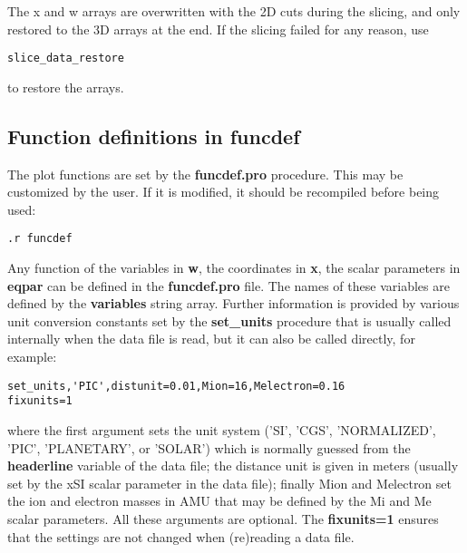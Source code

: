 \documentclass{article}
\begin{document}
   The x and w arrays are overwritten with the 2D cuts during the slicing,
   and only restored to the 3D arrays at the end.
   If the slicing failed for any reason, use
\begin{verbatim}
slice_data_restore
\end{verbatim}
   to restore the arrays.

\subsection{Function definitions in funcdef \label{s-funcdef}}

   The plot functions are set by the {\bf funcdef.pro} procedure.
   This may be customized by the user. If it is modified, 
   it should be recompiled before being used:
\begin{verbatim}
.r funcdef
\end{verbatim}
   Any function of the variables in {\bf w}, the coordinates in
   {\bf x}, the scalar parameters in {\bf eqpar} can be defined in the 
   {\bf funcdef.pro} file. The names of these variables are defined
   by the {\bf variables} string array.
   Further information is provided by various
   unit conversion constants set by the {\bf set\_units} procedure that
   is usually called internally when the data file is read, 
   but it can also be called directly, for example:
\begin{verbatim}
set_units,'PIC',distunit=0.01,Mion=16,Melectron=0.16
fixunits=1
\end{verbatim}
   where the first argument sets the unit system
   ('SI', 'CGS', 'NORMALIZED', 'PIC', 'PLANETARY', or 'SOLAR')
   which is normally guessed from the {\bf headerline} variable
   of the data file;
   the distance unit is given in meters (usually set by the xSI
   scalar parameter in the data file); finally 
   Mion and Melectron set the ion and electron masses in AMU
   that may be defined by the Mi and Me scalar parameters.
   All these arguments are optional.
   The {\bf fixunits=1} ensures that the settings are not changed
   when (re)reading a data file.
\end{document}
